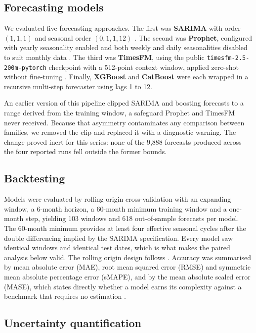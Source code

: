 \subsection{Forecasting models}

We evaluated five forecasting approaches. The first was \textbf{SARIMA} with order $(1,1,1)$
and seasonal order $(0,1,1,12)$ \citep{box2015}. The second was \textbf{Prophet}, configured
with yearly seasonality enabled and both weekly and daily seasonalities disabled to suit
monthly data \citep{taylor2018}. The third was \textbf{TimesFM}, using the public
\texttt{timesfm-2.5-200m-pytorch} checkpoint with a 512-point context window, applied
zero-shot without fine-tuning \citep{das2024}. Finally, \textbf{XGBoost} \citep{chen2016}
and \textbf{CatBoost} \citep{prokhorenkova2018} were each wrapped in a recursive multi-step
forecaster using lags 1 to 12.

An earlier version of this pipeline clipped SARIMA and boosting forecasts to a range
derived from the training window, a safeguard Prophet and TimesFM never received. Because
that asymmetry contaminates any comparison between families, we removed the clip and
replaced it with a diagnostic warning. The change proved inert for this series: none of the
9{,}888 forecasts produced across the four reported runs fell outside the former bounds.

\subsection{Backtesting}

Models were evaluated by rolling origin cross-validation with an expanding window, a
6-month horizon, a 60-month minimum training window and a one-month step, yielding 103
windows and 618 out-of-sample forecasts per model. The 60-month minimum provides at least
four effective seasonal cycles after the double differencing implied by the SARIMA
specification. Every model saw identical windows and identical test dates, which is what
makes the paired analysis below valid. The rolling origin design follows
\citet{tashman2000}. Accuracy was summarised by mean absolute error (MAE), root mean
squared error (RMSE) and symmetric mean absolute percentage error (sMAPE), and by the mean
absolute scaled error (MASE), which states directly whether a model earns its complexity
against a benchmark that requires no estimation \citep{hyndman2006}.

\subsection{Uncertainty quantification}

